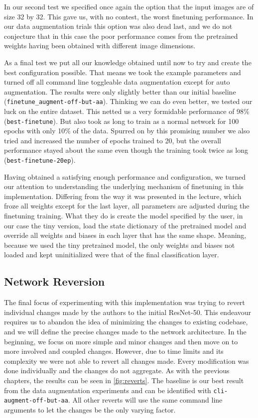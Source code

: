 \documentclass{article}
\begin{document}
In our second test we specified once again the option that the input images are of size 32 by 32.
This gave us, with no contest, the worst finetuning performance.
In our data augmentation trials this option was also dead last, and we do not conjecture that in this case the poor performance comes from the pretrained weights having been obtained with different image dimensions.

As a final test we put all our knowledge obtained until now to try and create the best configuration possible.
That means we took the example parameters and turned off all command line toggleable data augmentation except for auto augmentation.
The results were only slightly better than our initial baseline (\texttt{finetune\_augment-off-but-aa}).
Thinking we can do even better, we tested our luck on the entire dataset.
This netted us a very formidable performance of 98\% (\texttt{best-finetune}).
But also took as long to train as a normal network for 100 epochs with only 10\% of the data.
Spurred on by this promising number we also tried and increased the number of epochs trained to 20, but the overall performance stayed about the same even though the training took twice as long (\texttt{best-finetune-20ep}).

Having obtained a satisfying enough performance and configuration, we turned our attention to understanding the underlying mechanism of finetuning in this implementation.
Differing from the way it was presented in the lecture, which froze all weights except for the last layer, all parameters are adjusted during the finetuning training.
What they do is create the model specified by the user, in our case the tiny version, load the state dictionary of the pretrained model and override all weights and biases in each layer that has the same shape.
Meaning, because we used the tiny pretrained model, the only weights and biases not loaded and kept uninitialized were that of the final classification layer.


\subsection{Network Reversion}\label{subsec:network-reversion}
The final focus of experimenting with this implementation was trying to revert individual changes made by the authors to the initial ResNet-50.
This endeavour requires us to abandon the idea of minimizing the changes to existing codebase, and we will define the precise changes made to the network architecture.
In the beginning, we focus on more simple and minor changes and then move on to more involved and coupled changes.
However, due to time limits and its complexity we were not able to revert all changes made.
Every modification was done individually and the changes do not aggregate.
As with the previous chapters, the results can be seen in \autoref{fig:reverts}.
The baseline is our best result from the data augmentation experiments and can be identified with \texttt{cli-augment-off-but-aa}.
All other reverts will use the same command line arguments to let the changes be the only varying factor.
\end{document}

